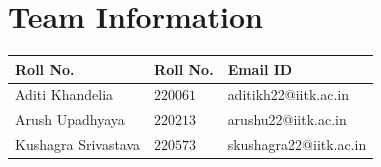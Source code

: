 \section*{Team Information}
\vspace{-3mm}
\begin{table}[H]
  \centering
  \begin{tabular}{lll}
    \toprule
    \textbf{Roll No.} & \textbf{Roll No.} & \textbf{Email ID} \\
    \midrule
    Aditi Khandelia & $220061$ & aditikh22@iitk.ac.in \\
    Arush Upadhyaya & $220213$ & arushu22@iitk.ac.in \\ 
    Kushagra Srivastava & $220573$ & skushagra22@iitk.ac.in \\  
    \bottomrule
  \end{tabular}
  \label{tab:table1}
\end{table}
